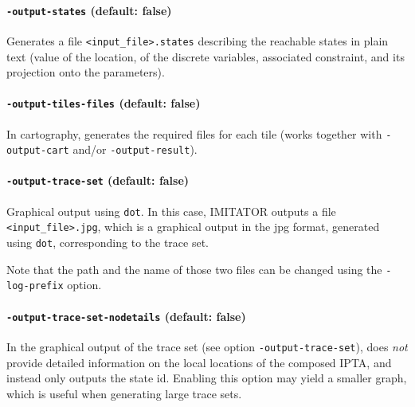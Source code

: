 \documentclass[a4paper,11pt]{report}
\newcommand{\gdot}{\texttt{dot}}
\newcommand{\imitator}{\textsf{IMITATOR}}
\newcommand{\IPTA}{IPTA}
\newcommand{\styleOption}[1]{\textcolor{optioncolor}{\texttt{#1}}}
\newcommand{\stylePath}[1]{\textcolor{pathcolor}{\texttt{#1}}}
\begin{document}
\paragraph{\styleOption{-output-states} (default: false)}
Generates a file \stylePath{<input\_file>.states} describing the reachable states in plain text (value of the location, of the discrete variables, associated constraint, and its projection onto the parameters).


\paragraph{\styleOption{-output-tiles-files} (default: false)}
In cartography, generates the required files for each tile (works together with \styleOption{-output-cart} and/or \styleOption{-output-result}).


\paragraph{\styleOption{-output-trace-set} (default: false)}
Graphical output using \gdot{}.
In this case, \imitator{} outputs a file \stylePath{<input\_file>.jpg}, which is a graphical output in the jpg format, generated using \gdot{}, corresponding to the trace set.

Note that the path and the name of those two files can be changed using the \stylePath{-log-prefix} option.


\paragraph{\styleOption{-output-trace-set-nodetails} (default: false)}

In the graphical output of the trace set (see option \styleOption{-output-trace-set}),
does \emph{not} provide detailed information on the local locations of the composed \IPTA{}, and instead only outputs the state id.
Enabling this option may yield a smaller graph, which is useful when generating large trace sets.


\end{document}
